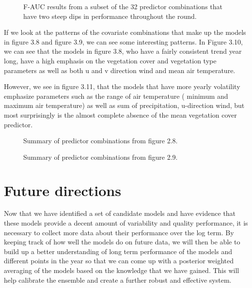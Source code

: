 \begin{figure} [!ht]
\centerline{}
\caption{F-AUC results from a subset of the 32 predictor combinations that have two steep dips in performance throughout the round. }
\label{fig6}
\end{figure}

\noindent  If we look at the patterns of the covariate combinations that make up the models in figure 3.8 and figure 3.9, we can see some interesting patterns. In Figure 3.10, we can see that the models in figure 3.8, who have a fairly consistent trend year long, have a high emphasis on the vegetation cover and vegetation type parameters as well as both u and v direction wind and mean air temperature. \newline

\noindent However, we see in figure 3.11, that the models that have more yearly volatility emphasize parameters such as the range of air temperature ( minimum and maximum air temperature) as well as sum of precipitation, u-direction wind, but most surprisingly is the almost complete absence of the mean vegetation cover predictor. \newline

\begin{figure} [t]
\centerline{}
\caption{Summary of predictor combinations from figure 2.8. }
\label{fig6}
\end{figure}

\begin{figure} [t]
\centerline{}
\caption{Summary of predictor combinations from figure 2.9. }
\label{fig6}
\end{figure}

  
\section{Future directions}

Now that we have identified a set of candidate models and have evidence that these models provide a decent amount of variability and quality performance, it is necessary to collect more data about their performance over the log term. By keeping track of how well the models do on future data, we will then be able to build up a better understanding of long term performance of the models and different points in the year so that we can come up with a posterior weighted averaging of the models based on the knowledge that we have gained. This will help calibrate the ensemble and create a further robust and effective system. \newline

